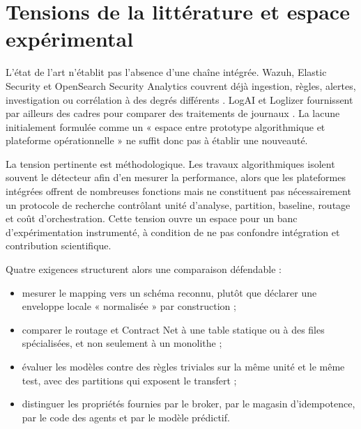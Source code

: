 
\section{Tensions de la littérature et espace expérimental}

L'état de l'art n'établit pas l'absence d'une chaîne intégrée. Wazuh, Elastic Security et
OpenSearch Security Analytics couvrent déjà ingestion, règles, alertes, investigation ou
corrélation à des degrés différents
\cite{wazuh2026architecture,elastic2026security,opensearch2026securityanalytics}.
LogAI et Loglizer fournissent par ailleurs des cadres pour comparer des traitements de
journaux \cite{cheng2023logai,he2016experience}. La lacune initialement formulée comme un
« espace entre prototype algorithmique et plateforme opérationnelle » ne suffit donc pas
à établir une nouveauté.

La tension pertinente est méthodologique. Les travaux algorithmiques isolent souvent le
détecteur afin d'en mesurer la performance, alors que les plateformes intégrées offrent
de nombreuses fonctions mais ne constituent pas nécessairement un protocole de recherche
contrôlant unité d'analyse, partition, baseline, routage et coût d'orchestration. Cette
tension ouvre un espace pour un banc d'expérimentation instrumenté, à condition de ne pas
confondre intégration et contribution scientifique.

Quatre exigences structurent alors une comparaison défendable :
\begin{itemize}
    \item mesurer le mapping vers un schéma reconnu, plutôt que déclarer une enveloppe
          locale « normalisée » par construction ;
    \item comparer le routage et Contract Net à une table statique ou à des files
          spécialisées, et non seulement à un monolithe ;
    \item évaluer les modèles contre des règles triviales sur la même unité et le même
          test, avec des partitions qui exposent le transfert ;
    \item distinguer les propriétés fournies par le broker, par le magasin d'idempotence,
          par le code des agents et par le modèle prédictif.
\end{itemize}

